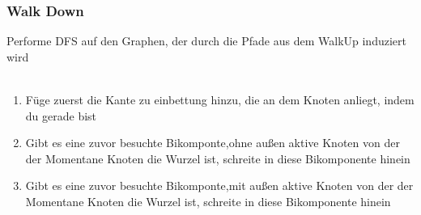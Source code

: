 \documentclass{beamer}
\begin{document}
\begin{frame}
\begin{figure}
\begin{subfigure}{.48\textwidth}
{
            }
        \end{subfigure}      
        \end{figure}
    \end{frame}
    
    \begin{frame}
        \frametitle{Walk Down}
            Performe DFS auf den Graphen, der durch die Pfade aus dem WalkUp induziert wird\\
        \\
        \begin{enumerate}
            \item Füge zuerst die Kante zu einbettung hinzu, die an dem Knoten anliegt, indem du gerade bist
            \item Gibt es eine zuvor besuchte Bikomponte,ohne außen aktive Knoten von der der Momentane Knoten die Wurzel ist, schreite in diese Bikomponente hinein
            \item Gibt es eine zuvor besuchte Bikomponte,mit außen aktive Knoten von der der Momentane Knoten die Wurzel ist, schreite in diese Bikomponente hinein
        \end{enumerate}
        
    
    \end{frame}
\end{document}
